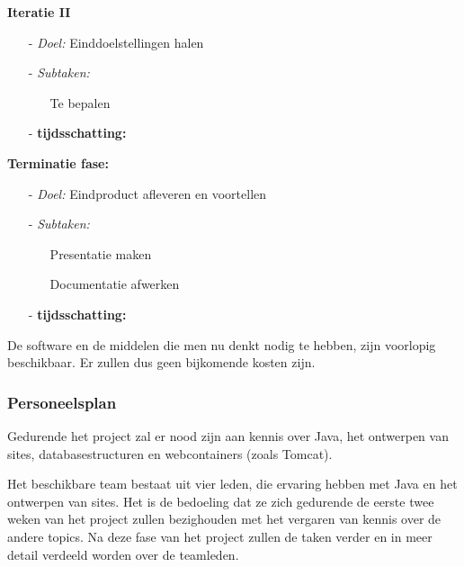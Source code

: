 \documentclass{article}
\begin{document}
\textbf{Iteratie II}
\begin{itemize}
\item[-] \textit{Doel:} Einddoelstellingen halen\\[-5mm]
\item[-] \textit{Subtaken:}\\[-5mm]
\begin{itemize}
	\item[] Te bepalen \\[-5mm]
\end{itemize}
\item[-] \textbf{tijdsschatting:} \\[-5mm]
\end{itemize}

\textbf{Terminatie fase:}
\begin{itemize}
\item[-] \textit{Doel:} Eindproduct afleveren en voortellen \\[-5mm]
\item[-] \textit{Subtaken:}\\[-5mm]
\begin{itemize}
	\item[] Presentatie maken \\[-5mm]
	\item[] Documentatie afwerken \\[-5mm]
\end{itemize}
\item[-] \textbf{tijdsschatting:} \\[-5mm]
\end{itemize}

De software en de middelen die men nu denkt nodig te hebben, zijn voorlopig beschikbaar. Er zullen dus geen bijkomende kosten zijn.

\subsubsection{Personeelsplan}

Gedurende het project zal er nood zijn aan kennis over Java, het ontwerpen van sites, databasestructuren en  webcontainers (zoals Tomcat). 

Het beschikbare team bestaat uit vier leden, die ervaring hebben met Java en het ontwerpen van sites. Het is de bedoeling dat ze zich gedurende de eerste twee weken van het project zullen bezighouden met het vergaren van kennis over de andere topics. Na deze fase van het project zullen de taken verder en in meer detail verdeeld worden over de teamleden.
\end{document}
